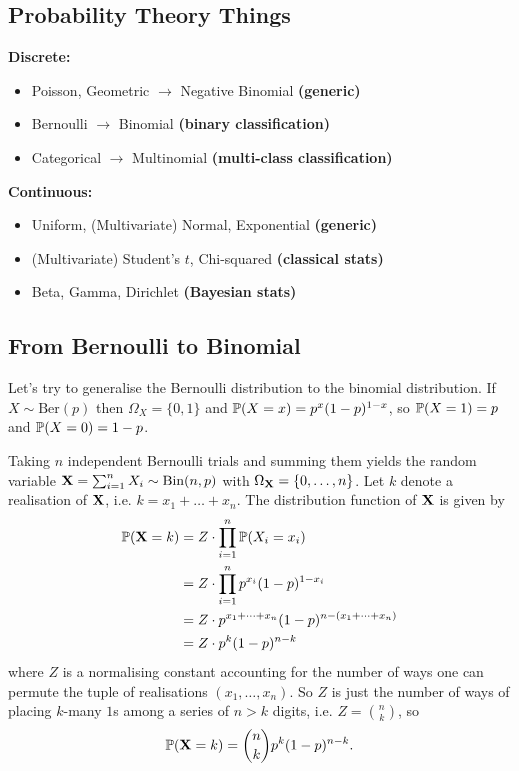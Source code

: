 \documentclass[11pt]{article}
\begin{document}
\newpage
\begin{appendices}

\section{Probability Theory Things}

\begin{tcolorbox}[colback=c5]
    \textbf{Discrete:}
    \begin{itemize}
        \item Poisson, Geometric $\rightarrow$ Negative Binomial \textbf{(generic)}
        \item Bernoulli $\rightarrow$ Binomial \textbf{(binary classification)}
        \item Categorical $\rightarrow$ Multinomial \textbf{(multi-class classification)}
    \end{itemize}
\end{tcolorbox}

\begin{tcolorbox}[colback=c9]
    \textbf{Continuous:}
    \begin{itemize}
        \item Uniform, (Multivariate) Normal, Exponential \textbf{(generic)}
        \item (Multivariate) Student's $t$, Chi-squared \textbf{(classical stats)}
        \item Beta, Gamma, Dirichlet \textbf{(Bayesian stats)}
    \end{itemize}
\end{tcolorbox}

\subsection{From Bernoulli to Binomial}
Let's try to generalise the Bernoulli distribution to the binomial distribution. If $X\sim\text{Ber}(p)$ then $\Omega_X=\{0,1\}$ and $\P(X=x)=p^x(1-p)^{1-x}$, so $\P(X=1)=p$ and $\P(X=0)=1-p$.

Taking $n$ independent Bernoulli trials and summing them yields the random variable $\X=\sum_{i=1}^nX_i\sim\text{Bin}(n,p)$ with $\OX=\{0,\dots,n\}$. Let $k$ denote a realisation of $\X$, i.e. $k=x_1+\dots+x_n$. The distribution function of $\X$ is given by
\begin{align*}
    \P(\X=k)
    &=
    Z\cdot\prod_{i=1}^n\P(X_i=x_i)\\
    &=
    Z\cdot\prod_{i=1}^np^{x_i}(1-p)^{1-x_i}\\
    &=
    Z\cdot p^{x_1+\dots+x_n}(1-p)^{n-(x_1+\dots+x_n)}\\
    &=
    Z\cdot p^k(1-p)^{n-k}
\end{align*}
where $Z$ is a normalising constant accounting for the number of ways one can permute the tuple of realisations $(x_1,\dots,x_n)$. So $Z$ is just the number of ways of placing $k$-many $1$s among a series of $n>k$ digits, i.e. $Z=\binom{n}{k}$, so
$$
\P(\X=k)
=
\binom{n}{k}p^k(1-p)^{n-k}.
$$


\end{appendices}
\end{document}
